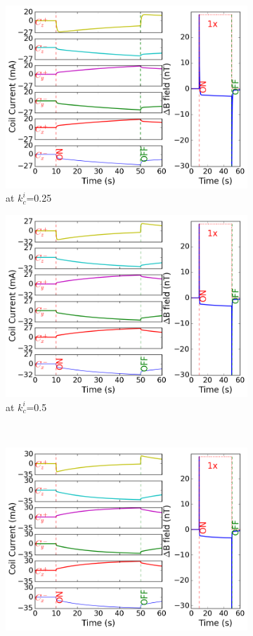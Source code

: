 \begin{figure}[!htb]
    \begin{subfigure}{.5\linewidth}
        \centering
        \includegraphics[width=\linewidth, height= 6.5 cm]{Images/i25}
        \caption{at $k_c^i$=0.25}
        \label{fig:i25m}
    \end{subfigure}%
    \begin{subfigure}{.5\linewidth}
        \centering
        \includegraphics[width=\linewidth, height= 6.5 cm]{Images/i50}
        \caption{at $k_c^i$=0.5}
        \label{fig:i50m}
    \end{subfigure}\\[1ex]
    \begin{subfigure}{.5\linewidth}
        \centering
        \includegraphics[width=\linewidth, height= 6.5 cm]{Images/i75}

\end{subfigure}
\end{figure}
